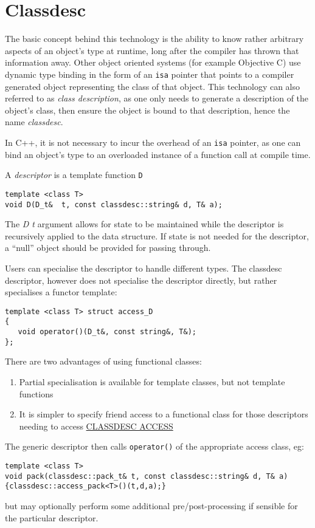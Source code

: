 \section{Classdesc}

\label{classdesc}

The basic concept behind this technology is the ability to know rather
arbitrary aspects of an object's type at runtime, long after the
compiler has thrown that information away. Other object oriented
systems (for example Objective C) use dynamic type binding in the form
of an {\tt isa} pointer that points to a compiler generated object
representing the class of that object. This technology can also
referred to as {\em class description}, as one only needs to generate
a description of the object's class, then ensure the object is bound
to that description, hence the name {\em classdesc}\cite{Madina-Standish01}.

In C++, it is not necessary to incur the overhead of an {\tt isa}
pointer, as one can bind an object's type to an overloaded instance of
a function call at compile time.

A {\em descriptor} is a template function \verb+D+\\
\begin{verbatim}
template <class T>
void D(D_t&  t, const classdesc::string& d, T& a);
\end{verbatim}

The {\em D t} argument allows for state to be maintained while the
descriptor is recursively applied to the data structure. If state is
not needed for the descriptor, a ``null'' object should be
provided for passing through.

Users can specialise the descriptor to handle different types. The
classdesc descriptor, however does not specialise the descriptor
directly, but rather specialises a functor template:\\
\begin{verbatim}
template <class T> struct access_D
{
   void operator()(D_t&, const string&, T&);
};
\end{verbatim}
There are two advantages of using functional classes:
\begin{enumerate}
\item Partial specialisation is available for template classes, but
  not template functions
\item It is simpler to specify friend access to a functional class for
  those descriptors needing to access 
   \hyperref{private or protected members}{(see \S}{)}{CLASSDESC ACCESS}
\end{enumerate}
The generic descriptor then calls \verb+operator()+ of the appropriate
access class, eg:
\begin{verbatim}
template <class T>
void pack(classdesc::pack_t& t, const classdesc::string& d, T& a)
{classdesc::access_pack<T>()(t,d,a);}
\end{verbatim}
but may optionally perform some additional pre/post-processing if
sensible for the particular descriptor.

